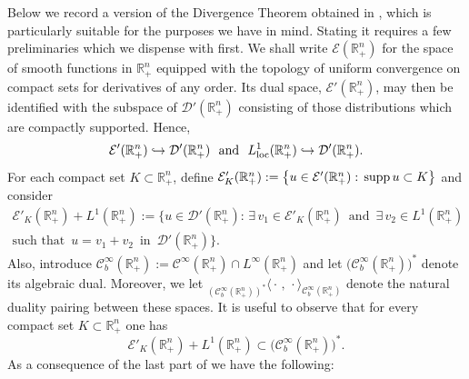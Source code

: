 \documentclass[11pt,reqno]{amsart}
\numberwithin{equation}{section}
\theoremstyle{remark}
\begin{document}
Below we record a version of the Divergence Theorem obtained in \cite{GHA.I}, 
which is particularly suitable for the purposes we have in mind. Stating it requires a few 
preliminaries which we dispense with first. We shall write $\mathcal{E}({\mathbb{R}}^n_{+})$
for the space of smooth functions in ${\mathbb{R}}^n_{+}$ equipped with the topology of uniform 
convergence on compact sets for derivatives of any order. Its dual space, $\mathcal{E}'({\mathbb{R}}^n_{+})$,  
may then be identified with the subspace of ${\mathcal{D}}'({\mathbb{R}}^n_{+})$ consisting of those 
distributions which are compactly supported. Hence,
%
\begin{equation}\label{TDanab.4r}
\mathcal{E}'({\mathbb{R}}^n_{+})\hookrightarrow\mathcal{D}'({\mathbb{R}}^n_{+})
\,\,\text{ and }\,\,L^1_{\rm loc}({\mathbb{R}}^n_{+})\hookrightarrow\mathcal{D}'({\mathbb{R}}^n_{+}).
\end{equation}
%
For each compact set $K\subset{\mathbb{R}}^n_{+}$, define
$\mathcal{E}'_K({\mathbb{R}}^n_{+}):=\big\{u\in\mathcal{E}'({\mathbb{R}}^n_{+})
:\,{\rm supp}\,u\subset K\big\}$ and consider
%
\begin{multline}\label{TDY-87764}
\mathcal{E}'_K({\mathbb{R}}^n_{+})+L^1({\mathbb{R}}^n_{+})
:=\big\{u\in\mathcal{D}'({\mathbb{R}}^n_{+}):\,\exists\,v_1\in
\mathcal{E}'_K({\mathbb{R}}^n_{+})\,\text{ and }\,
\exists\,v_2\in L^1({\mathbb{R}}^n_{+})
\\[4pt]
\text{such that }\,
u=v_1+v_2\,\text{ in }\,\mathcal{D}'({\mathbb{R}}^n_{+})\big\}.
\end{multline}
%
Also, introduce $\mathscr{C}_b^\infty({\mathbb{R}}^n_{+}):=
\mathscr{C}^\infty({\mathbb{R}}^n_{+})\cap L^\infty({\mathbb{R}}^n_{+})$
and let $\big(\mathscr{C}_b^\infty({\mathbb{R}}^n_{+})\big)^\ast$ denote its
algebraic dual. Moreover, we let
${}_{(\mathscr{C}_b^\infty({\mathbb{R}}^n_{+}))^\ast}\big\langle\cdot\,,\,\cdot
\big\rangle_{\mathscr{C}_b^\infty({\mathbb{R}}^n_{+})}$ denote the natural duality pairing
between these spaces. It is useful to observe that
for every compact set $K\subset{\mathbb{R}}^n_{+}$ one has
%
\begin{equation}\label{TDY-877ii}
\mathcal{E}'_K({\mathbb{R}}^n_{+})+L^1({\mathbb{R}}^n_{+})\subset
\big(\mathscr{C}_b^\infty({\mathbb{R}}^n_{+})\big)^\ast.
\end{equation}
%
As a consequence of the last part of \cite[Corollary~1.4.2, pp.\,40--41]{GHA.I} we have the following:
\end{document}
